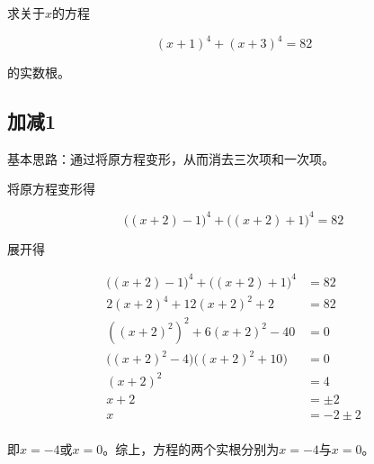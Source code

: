 

求关于$x$的方程

\[ (x + 1)^4 + (x + 3)^4 = 82 \]

的实数根。


\subsection{加减1}

基本思路：通过将原方程变形，从而消去三次项和一次项。

将原方程变形得

\[ \big((x + 2) - 1\big)^4 + \big((x + 2) + 1\big)^4 = 82 \]

展开得

\begin{align*}
  \big((x + 2) - 1\big)^4 + \big((x + 2) + 1\big)^4 &= 82 \\
  2(x + 2)^4 + 12(x + 2)^2 + 2 &= 82 \\
  \left((x + 2)^2\right)^2 + 6(x + 2)^2 - 40 &= 0 \\
  \big((x + 2)^2 - 4\big)\big((x + 2)^2 + 10\big) &= 0 \\
  (x + 2)^2 &= 4 \\
  x + 2 &= \pm2 \\
  x &= -2 \pm2 \\
\end{align*}

即$x = -4$或$x = 0$。综上，方程的两个实根分别为$x = -4$与$x = 0$。
